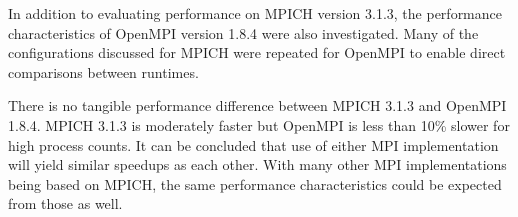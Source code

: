 In addition to evaluating performance on MPICH version 3.1.3, the performance
characteristics of OpenMPI version 1.8.4 were also investigated. Many of the
configurations discussed for MPICH were repeated for OpenMPI to enable direct
comparisons between runtimes.

There is no tangible performance difference between MPICH 3.1.3 and OpenMPI
1.8.4. MPICH 3.1.3 is moderately faster but OpenMPI is less than 10\% slower for
high process counts. It can be concluded that use of either MPI implementation
will yield similar speedups as each other. With many other MPI implementations
being based on MPICH, the same performance characteristics could be expected
from those as well.
